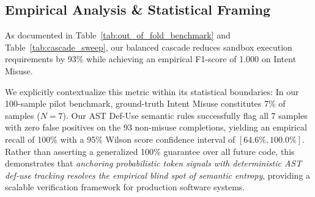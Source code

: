 \subsection{Empirical Analysis & Statistical Framing}
As documented in Table~\ref{tab:out_of_fold_benchmark} and Table~\ref{tab:cascade_sweep}, our balanced cascade reduces sandbox execution requirements by 93\% while achieving an empirical F1-score of 1.000 on Intent Misuse. 

We explicitly contextualize this metric within its statistical boundaries:
In our 100-sample pilot benchmark, ground-truth Intent Misuse constitutes 7\% of samples ($N=7$). Our AST Def-Use semantic rules successfully flag all 7 samples with zero false positives on the 93 non-misuse completions, yielding an empirical recall of 100\% with a 95\% Wilson score confidence interval of $[64.6\%, 100.0\%]$. Rather than asserting a generalized 100\% guarantee over all future code, this demonstrates that \emph{anchoring probabilistic token signals with deterministic AST def-use tracking resolves the empirical blind spot of semantic entropy}, providing a scalable verification framework for production software systems.
